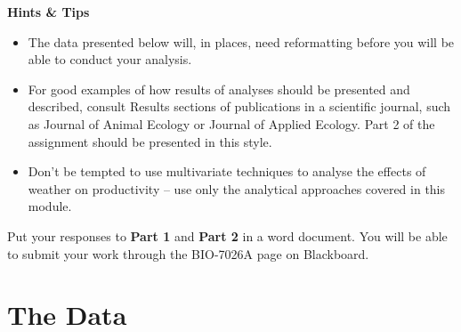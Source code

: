 \documentclass[
]{book}
\providecommand{\tightlist}{%
  \setlength{\itemsep}{0pt}\setlength{\parskip}{0pt}}
\begin{document}
\textbf{Hints \& Tips}

\begin{itemize}
\tightlist
\item
  The data presented below will, in places, need reformatting before you will be able to conduct your analysis.
\item
  For good examples of how results of analyses should be presented and described, consult Results sections of publications in a scientific journal, such as Journal of Animal Ecology or Journal of Applied Ecology. Part 2 of the assignment should be presented in this style.
\item
  Don't be tempted to use multivariate techniques to analyse the effects of weather on productivity -- use only the analytical approaches covered in this module.
\end{itemize}

Put your responses to \textbf{Part 1} and \textbf{Part 2} in a word document. You will be able to submit your work through the BIO-7026A page on Blackboard.

\hypertarget{the-data-3}{%
\section{The Data}\label{the-data-3}}
\end{document}
